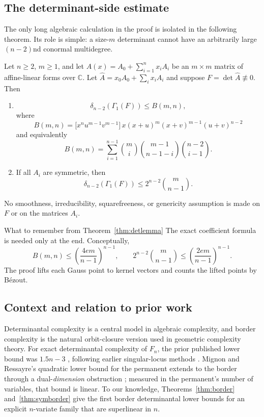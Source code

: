 \documentclass[acmsmall,screen,nonacm]{acmart}
\theoremstyle{definition}
\theoremstyle{remark}
\newcommand{\CC}{\mathbb{C}}
\newcommand{\pdeg}{\delta}
\newcommand{\Gone}{\Gamma_{\!1}}
\begin{document}
\subsection{The determinant-side estimate}

The only long algebraic calculation in the proof is isolated in the following theorem.  Its role is simple: a size-$m$ determinant cannot have an arbitrarily large $(n-2)$nd conormal multidegree.

\begin{theorem}\label{thm:detlemma}
Let $n\ge2$, $m\ge1$, and let $A(x)=A_0+\sum_{i=1}^n x_iA_i$ be an $m\times m$ matrix of affine-linear forms over $\CC$.  Let $\widehat A=x_0A_0+\sum_i x_iA_i$ and suppose $F=\det\widehat A\not\equiv0$.  Then
\begin{enumerate}[label=(\roman*),leftmargin=2.4em]
\item
\[
  \pdeg_{n-2}(\Gone(F))\le B(m,n),
\]
where
\[
  B(m,n)=\big[x^nu^{m-1}v^{m-1}\big]\,
  x(x+u)^m(x+v)^{m-1}(u+v)^{n-2}
\]
and equivalently
\[
  B(m,n)=\sum_{i=1}^{n-1}
  \binom{m}{i}\binom{m-1}{n-1-i}\binom{n-2}{i-1}.
\]
\item If all $A_i$ are symmetric, then
\[
  \pdeg_{n-2}(\Gone(F))\le
  2^{n-2}\binom{m}{n-1}.
\]
\end{enumerate}
No smoothness, irreducibility, squarefreeness, or genericity assumption is made on $F$ or on the matrices $A_i$.
\end{theorem}

\begin{readerbox}{What to remember from Theorem~\ref*{thm:detlemma}}
The exact coefficient formula is needed only at the end.  Conceptually,
\[
  B(m,n)\le\left(\frac{4em}{n-1}\right)^{n-1},
  \qquad
  2^{n-2}\binom{m}{n-1}\le\left(\frac{2em}{n-1}\right)^{n-1}.
\]
The proof lifts each Gauss point to kernel vectors and counts the lifted points by B\'ezout.
\end{readerbox}

\subsection{Context and relation to prior work}

Determinantal complexity is a central model in algebraic complexity, and border complexity is the natural orbit-closure version used in geometric complexity theory.  For exact determinantal complexity of $F_n$, the prior published lower bound was $1.5n-3$ \cite{KumarVolk21}, following earlier singular-locus methods \cite{AlperBogartVelasco17}.  Mignon and Ressayre's quadratic lower bound for the permanent \cite{MignonRessayre04} extends to the border through a dual-\emph{dimension} obstruction \cite{LMR13}; measured in the permanent's number of variables, that bound is linear.  To our knowledge, Theorems~\ref{thm:border} and~\ref{thm:symborder} give the first border determinantal lower bounds for an explicit $n$-variate family that are superlinear in $n$.
\end{document}
